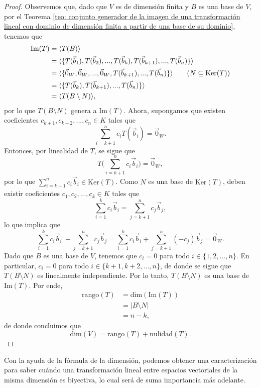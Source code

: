 \documentclass[notasLineal]{subfiles}
\begin{document}
\begin{proof}
    Observemos que, dado que $V$ es de dimensión finita y $B$ es una base de $V$, por el Teorema \ref{teo: conjunto generador de la imagen de una transformación lineal con dominio de dimensión finita a partir de una base de su dominio}, tenemos que
    \begin{align*}
        \text{Im}(T) &= \langle T(B) \rangle \\
                     &= \langle \{T(\vec{b}_1),T(\vec{b}_2), ...,T(\vec{b}_k), T(\vec{b}_{k+1}), ..., T(\vec{b}_n)\} \rangle \\
                     &= \langle \{\vec{0}_W,\vec{0}_W, ...,\vec{0}_W, T(\vec{b}_{k+1}), ..., T(\vec{b}_n)\} \rangle \tag{$N\subseteq \text{Ker}(T)$} \\
                     &= \langle \{T(\vec{b}_k), T(\vec{b}_{k+1}), ..., T(\vec{b}_n)\} \rangle \\
                     &= \langle T(B\setminus N) \rangle,
    \end{align*}
    por lo que $T(B\setminus N)$ genera a $\text{Im}(T)$. Ahora, supongamos que existen coeficientes $c_{k+1},c_{k+2},...,c_n\in K$ tales que 
    \[
        \sum_{i=k+1}^n c_i T(\vec{b}_i) = \vec{0}_W.
    \] 
    Entonces, por linealidad de $T$, se sigue que
    \[
        T \bigg( \sum_{i=k+1}^n c_i \vec{b}_i \bigg) = \vec{0}_W,
    \] 
    por lo que $\sum_{i=k+1}^n c_i \vec{b}_i \in \text{Ker}(T)$. Como $N$ es una base de $\text{Ker}(T)$, deben existir coeficientes $c_1,c_2,...,c_k\in K$ tales que
    \[
        \sum_{i=1}^k c_i \vec{b}_i = \sum_{j=k+1}^n c_j \vec{b}_j,
    \] 
    lo que implica que
    \[
        \sum_{i=1}^k c_i \vec{b}_i \ - \sum_{j=k+1}^n c_j \vec{b}_j = \sum_{i=1}^k c_i \vec{b}_i + \sum_{j=k+1}^n (-c_j) \vec{b}_j = \vec{0}_W.
    \] 
    Dado que $B$ es una base de $V$, tenemos que $c_i=0$ para todo $i\in\{1,2,...,n\}$. En particular, $c_i=0$ para todo $i\in\{k+1,k+2,...,n\}$, de donde se sigue que $T(B\setminus N)$ es linealmente independiente. Por lo tanto, $T(B\setminus N)$ es una base de $\text{Im}(T)$. Por ende,
    \begin{align*}
        \text{rango}(T) &= \text{dim}(\text{Im}(T)) \\
                        &= |B\setminus N| \\
                        &= n-k,
    \end{align*}
    de donde concluimos que
    \[
        \text{dim}(V) = \text{rango}(T) + \text{nulidad}(T).
    \] 
\end{proof}

Con la ayuda de la fórmula de la dimensión, podemos obtener una caracterización para saber cuándo una transformación lineal entre espacios vectoriales de la misma dimensión es biyectiva, lo cual será de suma importancia más adelante.
\end{document}
